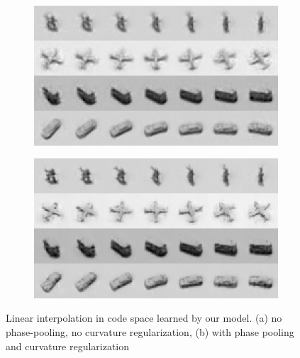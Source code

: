 \begin{figure}
  \centering
  \begin{subfigure}[b]{0.45\textwidth}
        \includegraphics[width=\textwidth]{./figures/linear/taco/interp_no_pool_no_reg.png}
        \caption{}
  \label{fig:noReg}
  \end{subfigure}
  \begin{subfigure}[b]{0.45\textwidth}
        \includegraphics[width=\textwidth]{./figures/linear/taco/interp_pool_best_reg.png} 
        \caption{}
        \label{fig:withReg}
  \end{subfigure}
  \caption{Linear interpolation in code space learned by our model. (a) no phase-pooling, no curvature regularization, (b) with phase pooling and curvature regularization}
\end{figure}


